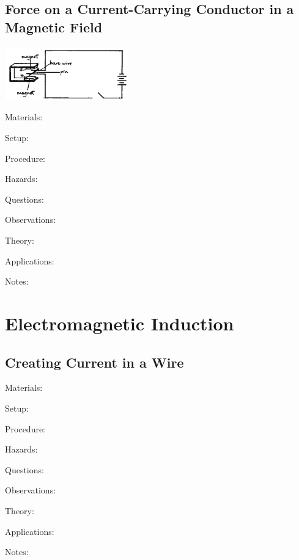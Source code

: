 \begin{multicols}{2}
\subsection{Force on a Current-Carrying Conductor in a Magnetic Field}

\begin{center}
\includegraphics[width=0.4\textwidth]{./img/source/force-wire.png}
\end{center}

\begin{description*}
\item[Materials:]{}
\item[Setup:]{}
\item[Procedure:]{}
\item[Hazards:]{}
\item[Questions:]{}
\item[Observations:]{}
\item[Theory:]{}
\item[Applications:]{}
\item[Notes:]{}
\end{description*}


\section*{Electromagnetic Induction}


\subsection{Creating Current in a Wire} %


\begin{description*}
\item[Materials:]{}
\item[Setup:]{}
\item[Procedure:]{}
\item[Hazards:]{}
\item[Questions:]{}
\item[Observations:]{}
\item[Theory:]{}
\item[Applications:]{}
\item[Notes:]{}
\end{description*}


\end{multicols}
